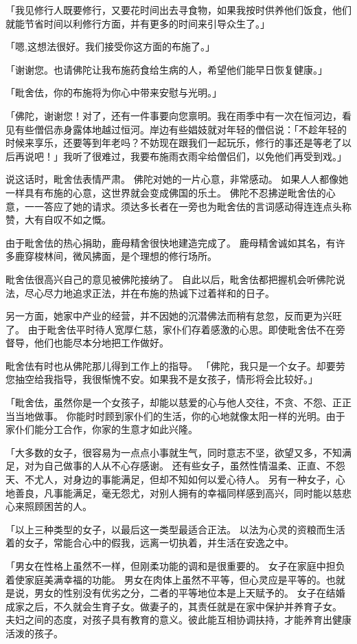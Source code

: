 \documentclass[twoside,openany]{book}
\begin{document}
「我见修行人既要修行，又要花时间出去寻食物，如果我按时供养他们饭食，他们就能节省时间以利修行方面，并有更多的时间来引导众生了。」

「嗯,这想法很好。我们接受你这方面的布施了。」

「谢谢您。也请佛陀让我布施药食给生病的人，希望他们能早日恢复健康。」

「毗舍佉，你的布施将为你心中带来安慰与光明。」

「佛陀，谢谢您！对了，还有一件事要向您禀明。我在雨季中有一次在恒河边，看见有些僧侣赤身露体地越过恒河。岸边有些娼妓就对年轻的僧侣说：「不趁年轻的时候来享乐，还要等到年老吗？不妨现在跟我们一起玩乐，修行的事还是等老了以后再说吧！」我听了很难过，我要布施雨衣雨伞给僧侣们，以免他们再受到戏。」

说这话时，毗舍佉表情严肃。
佛陀对她的一片心意，非常感动。
如果人人都像她一样具有布施的心意，这世界就会变成佛国的乐土。
佛陀不忍拂逆毗舍佉的心意，一一答应了她的请求。须达多长者在一旁也为毗舍佉的言词感动得连连点头称赞，大有自叹不如之慨。

由于毗舍佉的热心捐助，鹿母精舍很快地建造完成了。
鹿母精舍诚如其名，有许多鹿穿梭林间，微风拂面，是个理想的修行场所。

毗舍佉很高兴自己的意见被佛陀接纳了。
自此以后，毗舍佉都把握机会听佛陀说法，尽心尽力地追求正法，并在布施的热诚下过着祥和的日子。

另一方面，她家中产业的经营，并不因她的沉潜佛法而稍有怠忽，反而更为兴旺了。
由于毗舍佉平时待人宽厚仁慈，家仆们存着感激的心思。即使毗舍佉不在旁督导，他们也能尽本分地把工作做好。

毗舍佉有时也从佛陀那儿得到工作上的指导。
「佛陀，我只是一个女子。却要劳您抽空给我指导，我很惭愧不安。如果我不是女孩子，情形将会比较好。」

「毗舍佉，虽然你是一个女孩子，却能以慈爱的心与他人交往，不贪、不怨、正正当当地做事。
你能时时顾到家仆们的生活，你的心地就像太阳一样的光明。由于家仆们能分工合作，你家的生意才如此兴隆。

「大多数的女子，很容易为一点点小事就生气，同时意志不坚，欲望又多，不知满足，对为自己做事的人从不心存感谢。
还有些女子，虽然性情温柔、正直、不怨天、不尤人，对身边的事能满足，但却不知如何以爱心待人。
另有一种女子，心地善良，凡事能满足，毫无怨尤，对别人拥有的幸福同样感到高兴，同时能以慈悲心来照顾困苦的人。

「以上三种类型的女子，以最后这一类型最适合正法。
以法为心灵的资粮而生活着的女子，常能合心中的假我，远离一切执着，并生活在安逸之中。

「男女在性格上虽然不一样，但刚柔功能的调和是很重要的。
女子在家庭中担负着使家庭美满幸福的功能。
男女在肉体上虽然不平等，但心灵应是平等的。也就是说，男女的性别没有优劣之分，二者的平等地位本是上天赋予的。
女子在结婚成家之后，不久就会生育子女。做妻子的，其责任就是在家中保护并养育子女。
夫妇之间的态度，对孩子具有教育的意义。彼此能互相协调扶持，才能养育出健康活泼的孩子。
\end{document}
